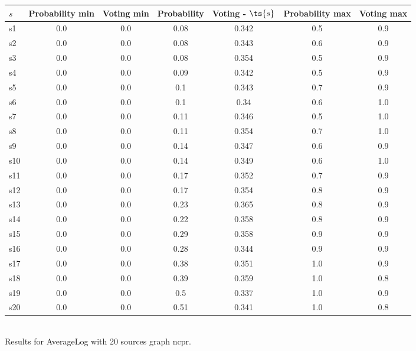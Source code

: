 \documentclass{article}
\begin{document}
\noindent\begin{tabular}{|l|c|c|c|c|c|c|}
\hline
$s$& Probability min & Voting min & Probability & Voting - $\ts{s}$ & Probability max & Voting max\\
\hline
s1 &0.0 & 0.0 & 0.08 & 0.342 & 0.5 & 0.9\\
\hline
s2 &0.0 & 0.0 & 0.08 & 0.343 & 0.6 & 0.9\\
\hline
s3 &0.0 & 0.0 & 0.08 & 0.354 & 0.5 & 0.9\\
\hline
s4 &0.0 & 0.0 & 0.09 & 0.342 & 0.5 & 0.9\\
\hline
s5 &0.0 & 0.0 & 0.1 & 0.343 & 0.7 & 0.9\\
\hline
s6 &0.0 & 0.0 & 0.1 & 0.34 & 0.6 & 1.0\\
\hline
s7 &0.0 & 0.0 & 0.11 & 0.346 & 0.5 & 1.0\\
\hline
s8 &0.0 & 0.0 & 0.11 & 0.354 & 0.7 & 1.0\\
\hline
s9 &0.0 & 0.0 & 0.14 & 0.347 & 0.6 & 0.9\\
\hline
s10 &0.0 & 0.0 & 0.14 & 0.349 & 0.6 & 1.0\\
\hline
s11 &0.0 & 0.0 & 0.17 & 0.352 & 0.7 & 0.9\\
\hline
s12 &0.0 & 0.0 & 0.17 & 0.354 & 0.8 & 0.9\\
\hline
s13 &0.0 & 0.0 & 0.23 & 0.365 & 0.8 & 0.9\\
\hline
s14 &0.0 & 0.0 & 0.22 & 0.358 & 0.8 & 0.9\\
\hline
s15 &0.0 & 0.0 & 0.29 & 0.358 & 0.9 & 0.9\\
\hline
s16 &0.0 & 0.0 & 0.28 & 0.344 & 0.9 & 0.9\\
\hline
s17 &0.0 & 0.0 & 0.38 & 0.351 & 1.0 & 0.9\\
\hline
s18 &0.0 & 0.0 & 0.39 & 0.359 & 1.0 & 0.8\\
\hline
s19 &0.0 & 0.0 & 0.5 & 0.337 & 1.0 & 0.9\\
\hline
s20 &0.0 & 0.0 & 0.51 & 0.341 & 1.0 & 0.8\\
\hline
\end{tabular}\\

\noindent Results for AverageLog with 20 sources graph ncpr.
\end{document}
